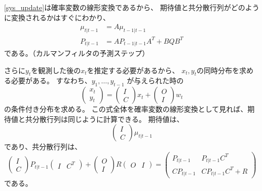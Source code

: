 \documentclass[textwidth-limit=45]{bxjsarticle}
\begin{document}
\eqref{sys_update}は確率変数の線形変換であるから、
期待値と共分散行列がどのように変換されるかはすぐにわかり、
\begin{align}
  \mu_{t|t-1} &= A \mu_{t-1|t-1} \\
  P_{t|t-1} &= A P_{t-1|t-1} A^T + B Q B^T
\end{align}
である。（カルマンフィルタの予測ステップ）

さらに$y_t$を観測した後の$x_t$を推定する必要があるから、
$x_t, y_t$の同時分布を求める必要がある。
すなわち、$y_1, \dots, y_{t-1}$ が与えられた時の
\begin{equation}
  \begin{pmatrix}
    x_t \\
    y_t
  \end{pmatrix} =
  \begin{pmatrix}
    I \\
    C
  \end{pmatrix} x_t +
  \begin{pmatrix}
    O \\
    I
  \end{pmatrix} w_t
\end{equation}
の条件付き分布を求める。
この式全体を確率変数の線形変換として見れば、期待値と共分散行列は同じように計算できる。
期待値は、
\begin{equation}
  \begin{pmatrix}
    I \\
    C
  \end{pmatrix} \mu_{t|t-1}
\end{equation}
であり、共分散行列は、
\begin{equation}
  \begin{pmatrix}
    I \\
    C
  \end{pmatrix} P_{t|t-1}
  \begin{pmatrix}
    I & C^T
  \end{pmatrix} + 
  \begin{pmatrix}
    O \\
    I
  \end{pmatrix} R
  \begin{pmatrix}
    O & I
  \end{pmatrix} =
  \begin{pmatrix}
    P_{t|t-1} & P_{t|t-1} C^T \\
    C P_{t|t-1} & C P_{t|t-1} C^T + R
  \end{pmatrix}
\end{equation}
である。
\end{document}

